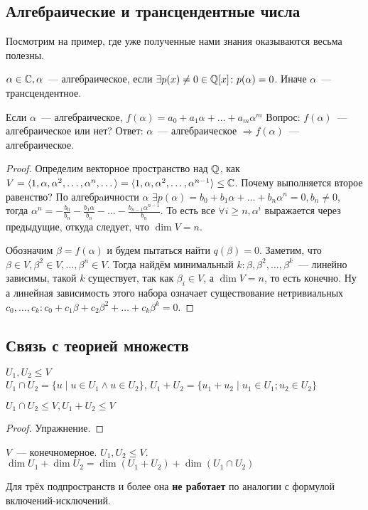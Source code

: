 \subsection{Алгебраические и трансцендентные числа}
\begin{motivation}
    Посмотрим на пример, где уже полученные нами знания оказываются весьма полезны.
\end{motivation} 
\begin{definition}
$\alpha\in\mathbb{C}, \alpha$~--- алгебраическое, если $\exists p(x)\not=0\in\mathbb{Q}[x] \colon p(\alpha)=0$.
Иначе $\alpha$~--- трансцендентное.
\end{definition}
Если $\alpha$~--- алгебраическое, $f(\alpha) = a_0 + a_1\alpha + \dots + a_m\alpha^m$
Вопрос: $f(\alpha)$~--- алгебраическое или нет?
Ответ:
$\alpha$~--- алгебраическое $\Rightarrow f(\alpha)$~--- алгебраическое.
\begin{proof}
    Определим векторное пространство над $\mathbb{Q}$, как 
    $V = \langle1, \alpha, \alpha^2,\dots,\alpha^n,\dots\rangle =
    \langle1, \alpha, \alpha^2,\dots,\alpha^{n-1}\rangle \le \mathbb{C}$.
    Почему выполняется второе равенство?
    По алгебрaичности $\alpha$ $\exists p(\alpha) = b_0+b_1\alpha+\dots+b_n\alpha^n = 0, b_n\not=0$, тогда
    $\alpha^n = -\frac{b_0}{b_n} - \frac{b_1\alpha}{b_n} - \dots - \frac{b_{n-1}\alpha^{n-1}}{b_n}$.
    То есть все $\forall i \ge n, \alpha^i$ выражается через предыдущие, откуда следует, что $\dim V = n$.

    Обозначим $\beta = f(\alpha)$ и будем пытаться найти $q(\beta)=0$.
    Заметим, что $\beta\in V, \beta^2\in V,\dots,\beta^n\in V$. 
    Тогда найдём минимальный $k: \beta,\beta^2,\dots,\beta^k$~--- линейно зависимы, такой $k$ существует,
    так как $\beta_i \in V$, а $\dim V = n$, то есть конечно.
    Ну а линейная зависимость этого набора означает существование нетривиальных 
    $c_0,\dots, c_k\colon c_0 + c_1\beta + c_2\beta^2 + \dots + c_k\beta^k=0$.
\end{proof}
\subsection{Связь с теорией множеств}
\begin{definition}
    $U_1, U_2\leq V$\\
    $U_1\cap U_2 = \{u \mid u\in U_1 \land u\in U_2\}$,
    $U_1+U_2 = \{u_1+u_2\mid u_1\in U_1; u_2\in U_2\}$
\end{definition}
\begin{statement}
    $U_1\cap U_2 \le V, U_1 + U_2 \le V$
\end{statement}
\begin{proof}
    Упражнение.
\end{proof}
\begin{theorem}
$V$~--- конечномерное. $U_1, U_2\leq V$. 
$\dim U_1 + \dim U_2 = \dim(U_1+U_2) + \dim(U_1\cap U_2)$
\end{theorem}
\begin{remark}
Для трёх подпространств и более она \textbf{не работает} по аналогии с формулой включений-исключений.
\end{remark}
